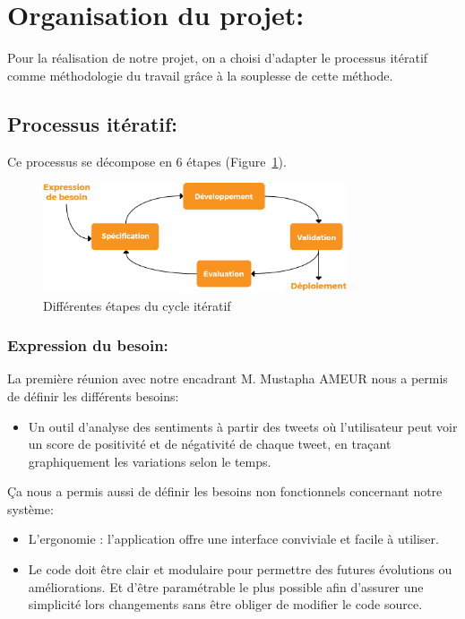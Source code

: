 \section{Organisation du projet:}
Pour la réalisation de notre projet, on a choisi d'adapter le processus itératif comme méthodologie du travail grâce à la souplesse de cette méthode.

\subsection{Processus itératif:}
Ce processus se décompose en 6 étapes (Figure~\ref{fig:cycleiteratif}).
\begin{figure}
    \centering
    \includegraphics[width=0.8\textwidth]{contexte-generale/assets/cycleiteratif.png}
    \caption{Différentes étapes du cycle itératif}
    \label{fig:cycleiteratif}
\end{figure}

\subsubsection{Expression du besoin:}
La première réunion avec notre encadrant M. Mustapha AMEUR nous a permis de définir les différents besoins: 
\begin{itemize}
    \item Un outil d'analyse des sentiments à partir des tweets où l'utilisateur peut voir un score de positivité et de négativité de chaque tweet, en traçant graphiquement les variations selon le temps.  
\end{itemize}

Ça nous a permis aussi de définir les besoins non fonctionnels concernant notre système:
\begin{itemize}
    \item L’ergonomie : l’application offre une interface conviviale et facile à utiliser.
    \item Le code doit être clair et modulaire pour permettre des futures évolutions ou améliorations. Et d’être paramétrable le plus possible afin d’assurer une simplicité lors changements sans être obliger de modifier le code source.
\end{itemize}


